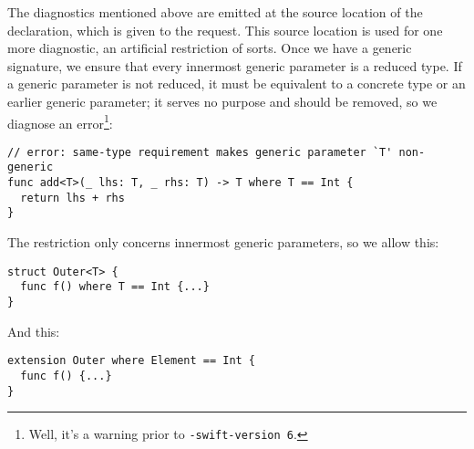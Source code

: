 \documentclass[../generics]{subfiles}
\begin{document}
\begin{figure}\label{inferred generic signature request figure}
\begin{center}
\end{center}
\end{figure}

The diagnostics mentioned above are emitted at the source location of the declaration, which is given to the request. This source location is used for one more diagnostic, an artificial restriction of sorts. Once we have a generic signature, we ensure that every innermost generic parameter is a reduced type. If a generic parameter is not reduced, it must be equivalent to a concrete type or an earlier generic parameter; it serves no purpose and should be removed, so we diagnose an error\footnote{Well, it's a warning prior to \texttt{-swift-version 6}.}:
\begin{Verbatim}
// error: same-type requirement makes generic parameter `T' non-generic
func add<T>(_ lhs: T, _ rhs: T) -> T where T == Int {
  return lhs + rhs
}
\end{Verbatim}
The restriction only concerns innermost generic parameters, so we allow this:
\begin{Verbatim}
struct Outer<T> {
  func f() where T == Int {...}
}
\end{Verbatim}
And this:
\begin{Verbatim}
extension Outer where Element == Int {
  func f() {...}
}
\end{Verbatim}
\end{document}
